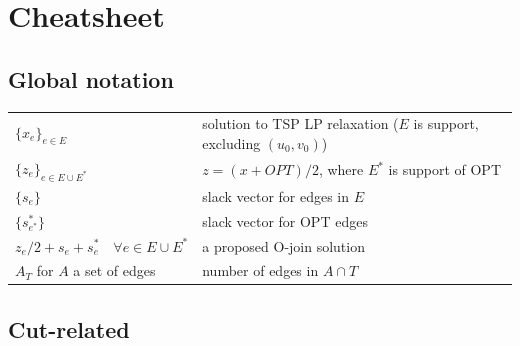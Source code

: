 \iffalse
\vfill\eject\section{Cheatsheet}
\label{app:notation}
{\small

\subsection*{Global notation}

 \begin{tabular}{|l |l |} 
  \hline\hline
$\{x_e\}_{e \in E}$ & solution to TSP LP relaxation   ($E$ is support, excluding $(u_0, v_0)$) \\
$\{z_{e}\}_{e \in E \cup E^*}$ & $z = (x+OPT)/2$, where $E^*$ is support of OPT \\
$\{s_e\}$ & slack vector for edges in $E$\\
$\{s^*_{e^*}\}$ & slack vector for OPT edges \\ 
$z_e/2 + s_e + s^*_e\quad\forall e \in E \cup E^*$ & a proposed O-join solution\\
$A_T$ for $A$ a set of edges & number of edges in $A \cap T$ \\
 \hline\hline
\end{tabular}





\subsection*{Cut-related}

}
